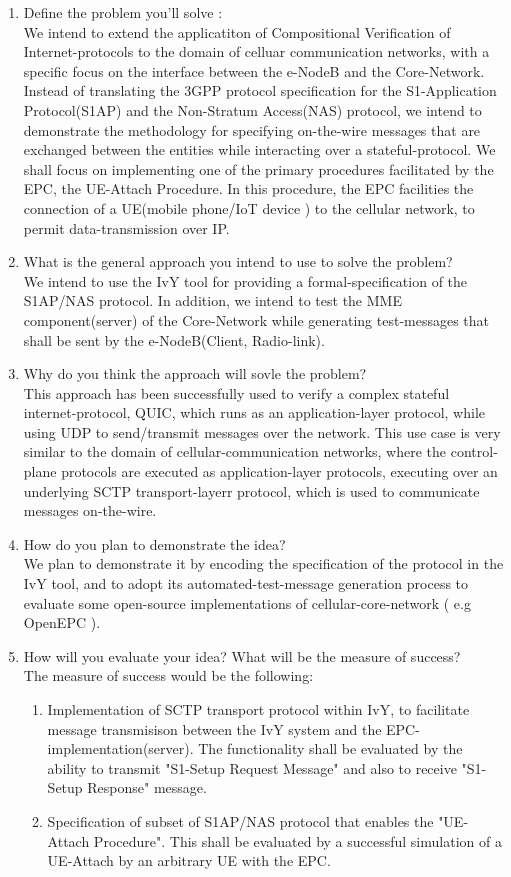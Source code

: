 \documentclass[acmsmall,review,authorversion]{acmart}
\begin{document}
  \begin{enumerate}
  \item Define the problem you'll solve :\\
  We intend to extend the applicatiton of Compositional Verification of Internet-protocols to the domain of celluar communication networks, with a specific focus on the interface between the e-NodeB and the Core-Network. Instead of translating the 3GPP protocol specification for the S1-Application Protocol(S1AP) and the Non-Stratum Access(NAS) protocol, we intend to demonstrate the methodology for specifying on-the-wire messages that are exchanged between the entities while interacting over a stateful-protocol. We shall focus on implementing one of the primary procedures facilitated by the EPC, the UE-Attach Procedure. In this procedure, the EPC facilities the connection of a UE(mobile phone/IoT device ) to the cellular network, to permit data-transmission over IP. 
  \item What is the general approach you intend to use to solve the problem? \\
  We intend to use the IvY tool for providing a formal-specification of the S1AP/NAS protocol. In addition, we intend to test the MME component(server) of the Core-Network while generating test-messages that shall be sent by the e-NodeB(Client, Radio-link). 
  \item Why do you think the approach will sovle the problem? \\
  This approach has been successfully used to verify a complex stateful internet-protocol, QUIC, which runs as an application-layer protocol, while using UDP to send/transmit messages over the network. This use case is very similar to the domain of cellular-communication networks, where the control-plane protocols are executed as application-layer protocols, executing over an underlying SCTP transport-layerr protocol, which is used to communicate messages on-the-wire. 
  \item How do you plan to demonstrate the idea? \\
  We plan to demonstrate it by encoding the specification of the protocol in the IvY tool, and to adopt its automated-test-message generation process to evaluate some open-source implementations of cellular-core-network ( e.g OpenEPC ). 
  \item How will you  evaluate your idea? What will be the measure of success? \\
  The measure of success would be the following: 
  \begin{enumerate}
  \item Implementation of SCTP transport protocol within IvY, to facilitate message transmisison between the IvY system and the EPC-implementation(server). The functionality shall be evaluated by the ability to transmit "S1-Setup Request Message" and also to receive "S1-Setup Response" message.
  \item Specification of subset of S1AP/NAS protocol that enables the "UE-Attach Procedure". This shall be evaluated by a successful simulation of a UE-Attach by an arbitrary UE with the EPC. 
  \end{enumerate}
  \end{enumerate}
\end{document}
